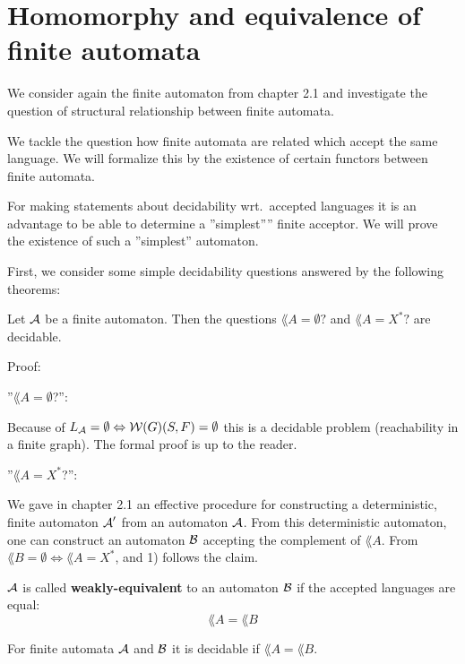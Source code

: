 \section{Homomorphy and equivalence of finite automata}

We consider again the finite automaton from chapter 2.1 and investigate the
question of structural relationship between finite automata.

We tackle the question how finite automata are related which accept the same
language. We will formalize this by the existence of certain functors between
finite automata.

For making statements about decidability wrt.\ accepted languages it is an
advantage to be able to determine a ''simplest'''' finite acceptor. We will
prove the existence of such a ''simplest'' automaton.

First, we consider some simple decidability questions answered by the following
theorems:

\begin{theorem}
Let $\mbox{$\mathcal{A}$}$ be a finite automaton. Then the questions $\lang{A} = \emptyset?$
and $\lang{A} = X^*?$ are decidable.
\end{theorem}

Proof:

''$\lang{A} = \emptyset$?'':

Because of $\mbox{$L_{\mathcal{A}}$} = \emptyset \Leftrightarrow \mbox{$\mathcal{W}(G)$}(S, F) =
\emptyset$ this is a decidable problem (reachability in a finite graph). The
formal proof is up to the reader.

''$\lang{A} = X^*$?'':

We gave in chapter 2.1 an effective procedure for constructing a deterministic,
finite automaton $\mbox{$\mathcal{A}$}'$ from an automaton $\mbox{$\mathcal{A}$}$. From this deterministic
automaton, one can construct an automaton $\mbox{$\mathcal{B}$}$ accepting the complement of
$\lang{A}$. From $\lang{B} = \emptyset \Leftrightarrow \lang{A} = X^*$,
and 1) follows the claim.

\begin{definition}
$\mbox{$\mathcal{A}$}$ is called {\bf weakly-equivalent} to an automaton $\mbox{$\mathcal{B}$}$ if the
accepted languages are equal: \[ \lang{A} = \lang{B} \]
\end{definition}

\begin{theorem}
For finite automata $\mbox{$\mathcal{A}$}$ and $\mbox{$\mathcal{B}$}$ it is decidable if $\lang{A} =
\lang{B}$.
\end{theorem}

